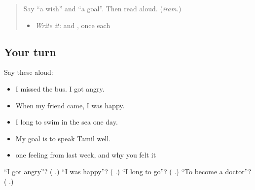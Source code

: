 \label{lesson:TA-R290-feelings-and-hopes}



\begin{quote}
Say \textquotedblleft{}a wish\textquotedblright{} and \textquotedblleft{}a goal\textquotedblright{}. Then read \textbf{} aloud. (\emph{īram}.)

\begin{itemize}
\raggedright
  \item \emph{Write it:} \textbf{} and \textbf{}, once each
\end{itemize}
\end{quote}

\subsection*{Your turn}
Say these aloud:

\begin{itemize}
\raggedright
  \item I missed the bus. I got angry.
  \item When my friend came, I was happy.
  \item I long to swim in the sea one day.
  \item My goal is to speak Tamil well.
  \item one feeling from last week, and why you felt it
\end{itemize}

\begin{tcolorbox}[breakable,colback=teal!4,colframe=teal!35!black,title={Before you move on}]
\textquotedblleft{}I got angry\textquotedblright{}? (\textbf{  }.) \textquotedblleft{}I was happy\textquotedblright{}? (\textbf{  }.) \textquotedblleft{}I long to go\textquotedblright{}? (\textbf{  }.) \textquotedblleft{}To become a doctor\textquotedblright{}? (\textbf{ }.)
\end{tcolorbox}
